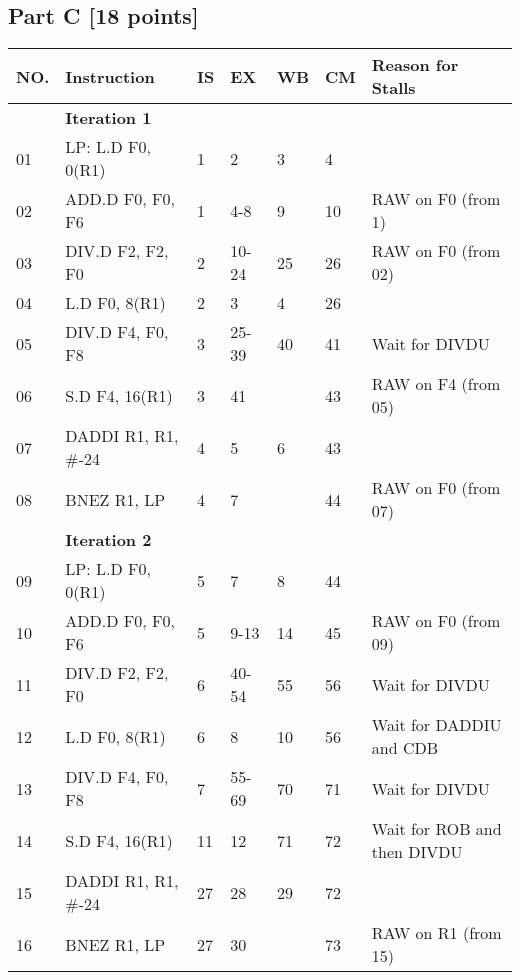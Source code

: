 \documentclass[11pt,leqno]{article}
\begin{document}
\subsection*{Part C [18 points]}

\begin{tabular}{|l | l | l | l | l | l | l |}
  \hline
  NO.& Instruction      & IS    & EX    & WB    & CM    & Reason for Stalls\\
  \hline
     &\textbf{Iteration 1}&       &       &       &       & \\
  \hline
  01 & LP: L.D F0, 0(R1)& 1     & 2     & 3     & 4     & \\
  \hline
  02 & ADD.D F0, F0, F6 & 1     & 4-8   & 9     & 10    & RAW on F0 (from 1)\\
  \hline
  03 & DIV.D F2, F2, F0 & 2     & 10-24 & 25    & 26    & RAW on F0 (from 02)\\
  \hline
  04 & L.D F0, 8(R1)    & 2     & 3     & 4     & 26    & \\
  \hline
  05 & DIV.D F4, F0, F8 & 3     & 25-39 & 40    & 41    & Wait for DIVDU\\
  \hline
  06 & S.D F4, 16(R1)   & 3     & 41    &       & 43    & RAW on F4 (from 05)\\
  \hline
  07 & DADDI R1, R1, \#-24&4     & 5     & 6     & 43    & \\
  \hline
  08 & BNEZ R1, LP      & 4     & 7     &       & 44    & RAW on F0 (from 07)\\
  \hline
     &\textbf{Iteration 2}&       &       &       &       & \\
  \hline
  09 & LP: L.D F0, 0(R1)& 5     & 7     & 8     & 44    & \\
  \hline
  10 & ADD.D F0, F0, F6 & 5     & 9-13  & 14    & 45    & RAW on F0 (from 09)\\
  \hline
  11 & DIV.D F2, F2, F0 & 6     & 40-54 & 55    & 56    & Wait for DIVDU\\
  \hline
  12 & L.D F0, 8(R1)    & 6     & 8     & 10    & 56    & Wait for DADDIU and CDB\\
  \hline
  13 & DIV.D F4, F0, F8 & 7     & 55-69 & 70    & 71    & Wait for DIVDU\\
  \hline
  14 & S.D F4, 16(R1)   & 11    & 12    & 71    & 72    & Wait for ROB and then DIVDU\\
  \hline
  15 & DADDI R1, R1, \#-24&27    & 28    & 29    & 72    & \\
  \hline
  16 & BNEZ R1, LP      & 27    & 30    &       & 73    & RAW on R1 (from 15)\\
  \hline
\end{tabular}
\end{document}
